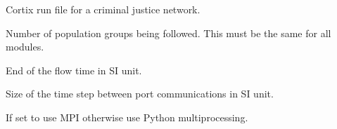 \documentclass[letterpaper,10pt,openany,oneside,english]{sphinxmanual}
\begin{document}
\begin{fulllineitems}
\label{\detokenize{examples_rst/run_region_justice:run_region_justice.main}}
Cortix run file for a criminal justice network.

\begin{fulllineitems}
\label{\detokenize{examples_rst/run_region_justice:run_region_justice.n_groups}}
 \textendash{} Number of population groups being followed. This must be the same for all
modules.

\end{fulllineitems}


\begin{fulllineitems}
\label{\detokenize{examples_rst/run_region_justice:run_region_justice.end_time}}
 \textendash{} End of the flow time in SI unit.

\end{fulllineitems}


\begin{fulllineitems}
\label{\detokenize{examples_rst/run_region_justice:run_region_justice.time_step}}
 \textendash{} Size of the time step between port communications in SI unit.

\end{fulllineitems}


\begin{fulllineitems}
\label{\detokenize{examples_rst/run_region_justice:run_region_justice.use_mpi}}
 \textendash{} If set to  use MPI otherwise use Python multiprocessing.

\end{fulllineitems}


\end{fulllineitems}
\end{document}
